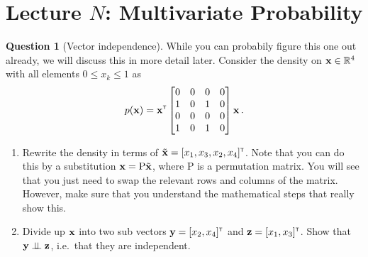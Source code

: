 \documentclass[a4paper]{article}
\newcommand{\mat}[1]{{\mathrm{{#1}}}} %
\theoremstyle{definition}
\newtheorem{question}{Question}
\begin{document}
\section{Lecture $N$: Multivariate Probability}
\begin{question}[Vector independence] {\color{red}While you can probabily figure this one out already, we will discuss this in more detail later.}
Consider the density on $\mathbf{x} \in \mathbb{R}^4$ with all elements $0 \leq x_k \leq 1$ as
\begin{align}
p(\mathbf{x}) = \mathbf{x}^\mathrm{\textsf{\tiny T}} \begin{bmatrix} 0 & 0 & 0 & 0 \\ 1 & 0 & 1 & 0 \\ 0 & 0 & 0 & 0 \\ 1 & 0 & 1 & 0\end{bmatrix} \mathbf{x} \,.
\end{align}
\begin{enumerate}[label=\alph*.]
\item Rewrite the density in terms of $\tilde{\mathbf{x}} = [x_1, x_3, x_2, x_4]^\mathrm{\textsf{\tiny T}}$. Note that you can do this by a substitution $\vx = \mat P \tilde\vx$, where $\mat P$ is a permutation matrix. You will see that you just need to swap the relevant rows and columns of the matrix. However, make sure that you understand the mathematical steps that really show this.
\item Divide up $\mathbf{x}$ into two sub vectors $\mathbf{y} = [x_2, x_4]^\mathrm{\textsf{\tiny T}}$ and $\mathbf{z} = [x_1, x_3]^\mathrm{\textsf{\tiny T}}$. Show that $\mathbf{y} \perp\!\!\!\perp \mathbf{z}$, i.e.~that they are independent.
\end{enumerate}
\end{question}























\printbibliography
\end{document}
